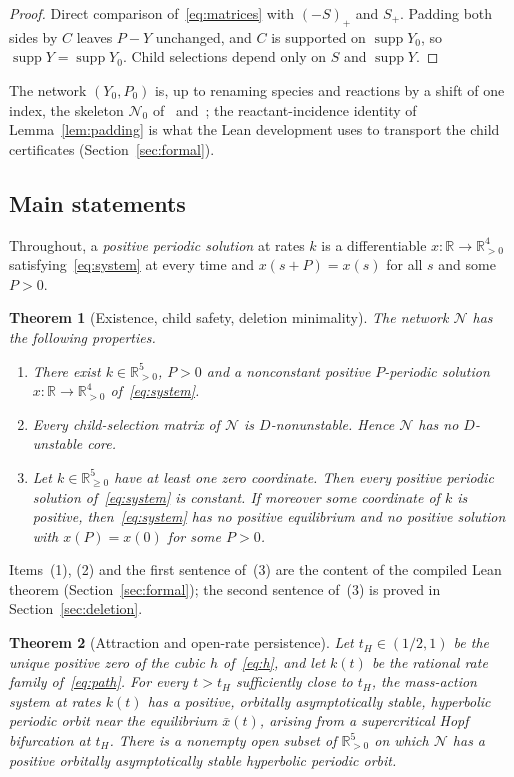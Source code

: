 \documentclass[11pt,a4paper]{article}
\theoremstyle{plain}
\newtheorem{theorem}{Theorem}[section]
\theoremstyle{definition}
\theoremstyle{remark}
\newcommand{\R}{\mathbb{R}}
\newcommand{\supp}{\operatorname{supp}}
\newcommand{\xbar}{\bar x}
\newcommand{\Sk}{\mathcal{N}_0}
\newcommand{\Osc}{\mathcal{N}}
\begin{document}
\begin{proof}
Direct comparison of~\eqref{eq:matrices} with $(-S)_+$ and $S_+$. Padding both sides by $C$ leaves $P-Y$ unchanged, and $C$ is supported on $\supp Y_0$, so $\supp Y=\supp Y_0$. Child selections depend only on $S$ and $\supp Y$.
\end{proof}

The network $(Y_0,P_0)$ is, up to renaming species and reactions by a shift of one index, the skeleton $\Sk$ of~\cite{ParameterRich2026} and~\cite[Section~4]{KineticOrder2026}; the reactant-incidence identity of Lemma~\ref{lem:padding} is what the Lean development uses to transport the child certificates (Section~\ref{sec:formal}).

\subsection{Main statements}\label{sec:main}

Throughout, a \emph{positive periodic solution} at rates $k$ is a differentiable $x\colon\R\to\R_{>0}^4$ satisfying~\eqref{eq:system} at every time and $x(s+P)=x(s)$ for all $s$ and some $P>0$.

\begin{theorem}[Existence, child safety, deletion minimality]\label{thm:main}
The network $\Osc$ has the following properties.
\begin{enumerate}[label=\textup{(\arabic*)}]
\item There exist $k\in\R_{>0}^5$, $P>0$ and a nonconstant positive $P$-periodic solution $x\colon\R\to\R_{>0}^4$ of~\eqref{eq:system}.
\item Every child-selection matrix of $\Osc$ is $D$-nonunstable. Hence $\Osc$ has no $D$-unstable core.
\item Let $k\in\R_{\ge0}^5$ have at least one zero coordinate. Then every positive periodic solution of~\eqref{eq:system} is constant. If moreover some coordinate of $k$ is positive, then~\eqref{eq:system} has no positive equilibrium and no positive solution with $x(P)=x(0)$ for some $P>0$.
\end{enumerate}
\end{theorem}

Items~(1), (2) and the first sentence of~(3) are the content of the compiled Lean theorem  (Section~\ref{sec:formal}); the second sentence of~(3) is proved in Section~\ref{sec:deletion}.

\begin{theorem}[Attraction and open-rate persistence]\label{thm:attract}
Let $t_H\in(1/2,1)$ be the unique positive zero of the cubic $h$ of~\eqref{eq:h}, and let $k(t)$ be the rational rate family of~\eqref{eq:path}. For every $t>t_H$ sufficiently close to $t_H$, the mass-action system at rates $k(t)$ has a positive, orbitally asymptotically stable, hyperbolic periodic orbit near the equilibrium $\xbar(t)$, arising from a supercritical Hopf bifurcation at $t_H$. There is a nonempty open subset of $\R_{>0}^5$ on which $\Osc$ has a positive orbitally asymptotically stable hyperbolic periodic orbit.
\end{theorem}
\end{document}
